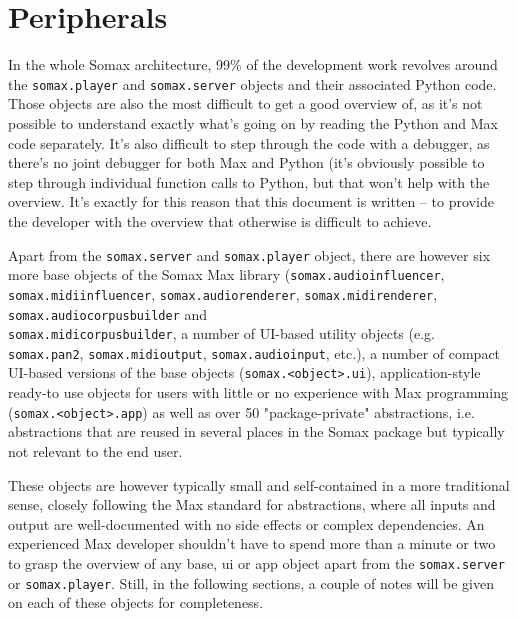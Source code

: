 \section{Peripherals}\label{ssec:3-peripherals}
In the whole Somax architecture, 99\% of the development work revolves around the \texttt{somax.player} and \texttt{somax.server} objects and their associated Python code. Those objects are also the most difficult to get a good overview of, as it's not possible to understand exactly what's going on by reading the Python and Max code separately. It's also difficult to step through the code with a debugger, as there's no joint debugger for both Max and Python (it's obviously possible to step through individual function calls to Python, but that won't help with the overview. It's exactly for this reason that this document is written – to provide the developer with the overview that otherwise is difficult to achieve.

Apart from the \texttt{somax.server} and \texttt{somax.player} object, there are however six more base objects of the Somax Max library (\texttt{somax.audioinfluencer}, \texttt{somax.midiinfluencer}, \texttt{somax.audiorenderer}, \texttt{somax.midirenderer}, \texttt{somax.audiocorpusbuilder} and \\ \texttt{somax.midicorpusbuilder}, a number of UI-based utility objects (e.g. \texttt{somax.pan2}, \texttt{somax.midioutput}, \texttt{somax.audioinput}, etc.), a number of compact UI-based  versions of the base objects (\texttt{somax.<object>.ui}), application-style ready-to use objects for users with little or no experience with Max programming (\texttt{somax.<object>.app})  as well as over 50 "package-private" abstractions, i.e. abstractions that are reused in several places in the Somax package but typically not relevant to the end user. 

These objects are however typically small and self-contained in a more traditional sense, closely following the Max standard for abstractions, where all inputs and output are well-documented with no side effects or complex dependencies. An experienced Max developer shouldn't have to spend more than a minute or two to grasp the overview of any base, ui or app object apart from the \texttt{somax.server} or \texttt{somax.player}. Still, in the following sections, a couple of notes will be given on each of these objects for completeness.



